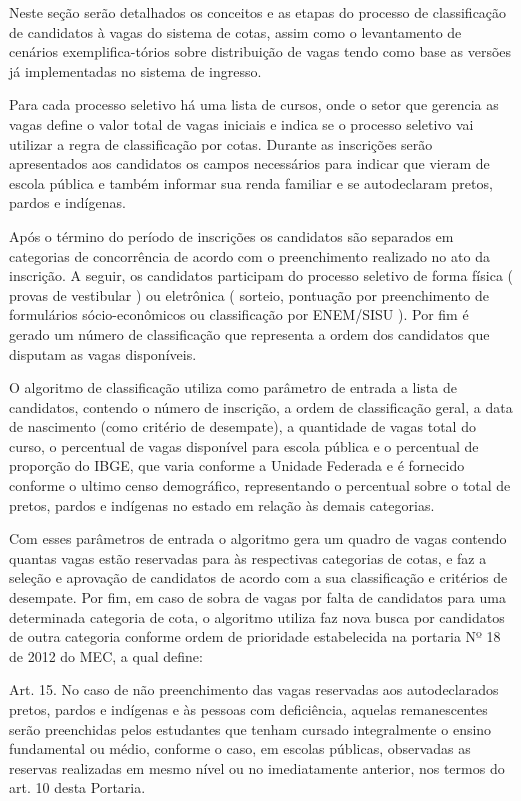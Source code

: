 Neste seção serão detalhados os conceitos e as etapas do processo de classificação de candidatos à vagas do sistema de cotas, assim como o levantamento de cenários exemplifica-tórios sobre distribuição de vagas tendo como base as versões já implementadas no sistema de ingresso.

Para cada processo seletivo há uma lista de cursos, onde o setor que gerencia as vagas define o valor total de vagas iniciais e indica se o processo seletivo vai utilizar a regra de classificação por cotas. Durante as inscrições serão apresentados aos candidatos os campos necessários para indicar que vieram de escola pública e também informar sua renda familiar e se autodeclaram pretos, pardos e indígenas.

Após o término do período de inscrições os candidatos são separados em categorias de concorrência de acordo com o preenchimento realizado no ato da inscrição. A seguir, os candidatos participam do processo seletivo de forma física ( provas de vestibular ) ou eletrônica ( sorteio, pontuação por preenchimento de formulários sócio-econômicos ou classificação por ENEM/SISU ). Por fim é gerado um número de classificação que representa a ordem dos candidatos que disputam as vagas disponíveis.

O algoritmo de classificação utiliza como parâmetro de entrada a lista de candidatos, contendo o número de inscrição, a ordem de classificação geral, a data de nascimento (como critério de desempate), a quantidade de vagas total do curso, o percentual de vagas disponível para escola pública e o percentual de proporção do \gls{IBGE}, que varia conforme a Unidade Federada e é fornecido conforme o ultimo censo demográfico, representando o percentual sobre o total de pretos, pardos e indígenas no estado em relação às demais categorias.

Com esses parâmetros de entrada o algoritmo gera um quadro de vagas contendo quantas vagas estão reservadas para às respectivas categorias de cotas, e faz a seleção e aprovação de candidatos de acordo com a sua classificação e critérios de desempate. Por fim, em caso de sobra de vagas por falta de candidatos para uma determinada categoria de cota, o algoritmo utiliza faz nova busca por candidatos de outra categoria conforme ordem de prioridade estabelecida na portaria Nº 18 de 2012 do \gls{MEC}, a qual define:

\begin{citacao}
Art. 15. No caso de não preenchimento das vagas reservadas aos autodeclarados pretos, pardos
e indígenas e às pessoas com deficiência, aquelas remanescentes serão preenchidas pelos
estudantes que tenham cursado integralmente o ensino fundamental ou médio, conforme o caso,
em escolas públicas, observadas as reservas realizadas em mesmo nível ou no imediatamente
anterior, nos termos do art. 10 desta Portaria. \cite{portarianr9}
\end{citacao}

